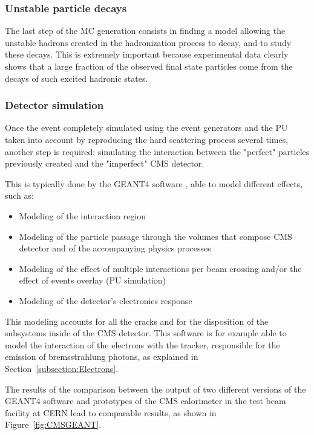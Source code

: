 \documentclass[a4paper, 10pt, openright]{report}
\begin{document}
\subsubsection*{Unstable particle decays}

The last step of the \ac{MC} generation consists in finding a model allowing the unstable hadrons created in the hadronization process to decay, and to study these decays. This is extremely important because experimental data clearly shows that a large fraction of the observed final state particles come from the decays of such excited hadronic states.

\subsubsection*{Detector simulation}

Once the event completely simulated using the event generators and the \ac{PU} taken into account by reproducing the hard scattering process several times, another step is required: simulating the interaction between the "perfect" particles previously created and the "imperfect" \ac{CMS} detector. 

This is typically done by the GEANT4 software \cite{Geant4}, able to model different effects, such as:

\begin{itemize}
\item Modeling of the interaction region
\item Modeling of the particle passage through the volumes that compose CMS detector and of the accompanying physics processes
\item Modeling of the effect of multiple interactions per beam crossing and/or the effect of events overlay (\ac{PU} simulation)
\item Modeling of the detector's electronics response
\end{itemize}

This modeling accounts for all the cracks and for the disposition of the subsystems inside of the \ac{CMS} detector. This software is for example able to model the interaction of the electrons with the tracker, responsible for the emission of bremsstrahlung photons, as explained in Section~\ref{subsection:Electrons}.

The results of the comparison between the output of two different versions of the GEANT4 software and prototypes of the CMS calorimeter in the test beam facility at \ac{CERN} lead to comparable results, as shown in Figure~\ref{fig:CMSGEANT}.
\end{document}
